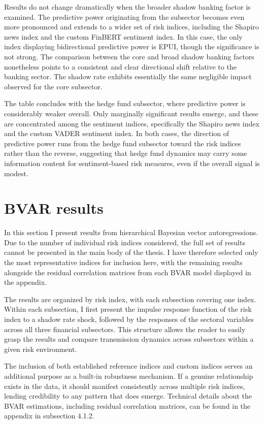 \documentclass[12pt,a4paper]{report}
\begin{document}
Results do not change dramatically when the broader shadow banking factor is examined. The predictive power originating from the subsector becomes even more pronounced and extends to a wider set of risk indices, including the Shapiro news index and the custom FinBERT sentiment index. In this case, the only index displaying bidirectional predictive power is EPUI, though the significance is not strong. The comparison between the core and broad shadow banking factors nonetheless points to a consistent and clear directional shift relative to the banking sector. The shadow rate exhibits essentially the same negligible impact observed for the core subsector.

The table concludes with the hedge fund subsector, where predictive power is considerably weaker overall. Only marginally significant results emerge, and these are concentrated among the sentiment indices, specifically the Shapiro news index and the custom VADER sentiment index. In both cases, the direction of predictive power runs from the hedge fund subsector toward the risk indices rather than the reverse, suggesting that hedge fund dynamics may carry some information content for sentiment-based risk measures, even if the overall signal is modest.

\section{BVAR results}

In this section I present results from hierarchical Bayesian vector autoregressions. Due to the number of individual risk indices considered, the full set of results cannot be presented in the main body of the thesis. I have therefore selected only the most representative indices for inclusion here, with the remaining results alongside the residual correlation matrices from each BVAR model displayed in the appendix.

The results are organized by risk index, with each subsection covering one index. Within each subsection, I first present the impulse response function of the risk index to a shadow rate shock, followed by the responses of the sectoral variables across all three financial subsectors. This structure allows the reader to easily grasp the results and compare transmission dynamics across subsectors within a given risk environment.

The inclusion of both established reference indices and custom indices serves an additional purpose as a built-in robustness mechanism. If a genuine relationship exists in the data, it should manifest consistently across multiple risk indices, lending credibility to any pattern that does emerge. Technical details about the BVAR estimations, including residual correlation matrices, can be found in the appendix in subsection 4.1.2. 
\end{document}
